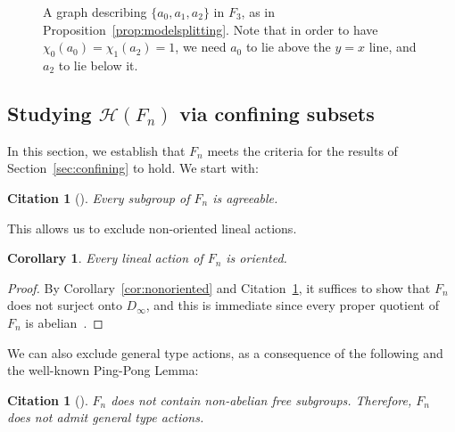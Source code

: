 \documentclass[10pt,a4paper]{article}
\newtheorem{coro}[cdrthm]{Corollary}
\theoremstyle{definition}
\theoremstyle{remark}
\newcommand{\Hyp}{\mathcal{H}}
\theoremstyle{plain}
\newtheorem{cit}[cdrthm]{Citation}
\begin{document}
\begin{figure}[htb]
\centering
{}
\caption{A graph describing $\{ a_0, a_1, a_2 \}$ in $F_3$, as in Proposition~\ref{prop:modelsplitting}. Note that in order to have $\chi_0(a_0)=\chi_1(a_2)=1$, we need $a_0$ to lie above the $y=x$ line, and $a_2$ to lie below it.}
\label{fig:bumps}
\end{figure}


\subsection{Studying \texorpdfstring{$\Hyp(F_n)$}{Hyp(Fn)} via confining subsets}

In this section, we establish that $F_n$ meets the criteria for the results of Section~\ref{sec:confining} to hold. We start with:

\begin{cit}[{\cite{calegari:PL, commutingconjugates}}]
\label{cit:F_agreeable}
Every subgroup of $F_n$ is agreeable.
\end{cit}

This allows us to exclude non-oriented lineal actions.

\begin{coro}\label{cor:nonoriented:f}
Every lineal action of $F_n$ is oriented.
\end{coro}

\begin{proof}
By Corollary~\ref{cor:nonoriented} and Citation~\ref{cit:F_agreeable}, it suffices to show that $F_n$ does not surject onto $D_\infty$, and this is immediate since every proper quotient of $F_n$ is abelian~\cite[Theorem~4.13]{brown87}.
\end{proof}

We can also exclude general type actions, as a consequence of the following and the well-known Ping-Pong Lemma:

\begin{cit}[\cite{brin85}]
\label{cit:nofree}
    $F_n$ does not contain non-abelian free subgroups. Therefore, $F_n$ does not admit general type actions.
\end{cit}
\end{document}
